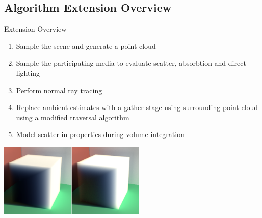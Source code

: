 \documentclass[10pt,compress,professionalfont]{beamer}
\begin{document}
\subsection{Algorithm Extension Overview}
\begin{frame}{Extension Overview}

    \begin{enumerate}
        \item Sample the scene and generate a point cloud
        \item \alert{ Sample the participating media to evaluate scatter, absorbtion and direct lighting}
        \item Perform normal ray tracing
        \item Replace ambient estimates with a gather stage using surrounding point cloud \alert{using a modified traversal algorithm}
        \item \alert{ Model scatter-in properties during volume integration}
    \end{enumerate}
    \vspace{4mm}
    {\centering
        \includegraphics[width=70mm]{../img/inscat_comp2}\\
    }

\end{frame}
\end{document}
